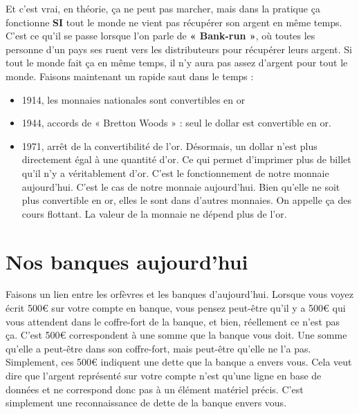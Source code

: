 \documentclass{bredele} %
\begin{document}
    Et c’est vrai, en théorie, ça ne peut pas marcher, mais dans la pratique ça fonctionne \textbf{SI} tout le monde ne vient pas récupérer son argent en même temps.
    C’est ce qu’il se passe lorsque l’on parle de \textbf{« Bank-run »}, où toutes les personne d’un pays ses ruent vers les distributeurs pour récupérer leurs argent. Si tout le monde fait ça en même temps, il n’y aura pas assez d’argent pour tout le monde.
    \newline
    \newline
    Faisons maintenant un rapide saut dans le temps :
    \begin{itemize}
        \item 1914, les monnaies nationales sont convertibles en or
        \item 1944, accords de « Bretton Woods » : seul le dollar est convertible en or.
        \item 1971, arrêt de la convertibilité de l’or. Désormais, un dollar n’est plus directement égal à une quantité d’or. Ce qui permet d’imprimer plus de billet qu’il n’y a véritablement d’or. C’est le fonctionnement de notre monnaie aujourd’hui. C’est le cas de notre monnaie aujourd’hui.  Bien qu’elle ne soit plus convertible en or, elles le sont dans d’autres monnaies. On appelle ça des cours flottant. La valeur de la monnaie ne dépend plus de l’or.
    \end{itemize}
    \section*{Nos banques aujourd'hui}
    Faisons un lien entre les orfèvres et les banques d’aujourd’hui. \newline
    Lorsque vous voyez écrit 500€ sur votre compte en banque, vous pensez peut-être qu’il y a 500€ qui vous attendent dans le coffre-fort de la banque, et bien, réellement ce n’est pas ça. C’est 500€ correspondent à une somme que la banque vous doit. Une somme qu’elle a peut-être dans son coffre-fort, mais peut-être qu’elle ne l’a pas. Simplement, ces 500€ indiquent une dette que la banque a envers vous. Cela veut dire que l’argent représenté sur votre compte n’est qu’une ligne en base de données et ne correspond donc pas à un élément matériel précis. C’est simplement une reconnaissance de dette de la banque envers vous.
\end{document}
